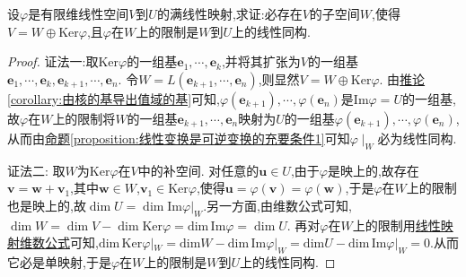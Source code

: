 \documentclass[../../main.tex]{subfiles}%
\begin{document}
\begin{example}
设\(\varphi\)是有限维线性空间\(V\)到\(U\)的满线性映射,求证:必存在\(V\)的子空间\(W\),使得\(V = W\oplus\text{Ker}\varphi\),且\(\varphi\)在\(W\)上的限制是\(W\)到\(U\)上的线性同构.
\end{example}
\begin{proof}

{\color{blue}证法一:}取\(\text{Ker}\varphi\)的一组基\(\boldsymbol{e}_1,\cdots,\boldsymbol{e}_k\),并将其扩张为\(V\)的一组基\(\boldsymbol{e}_1,\cdots,\boldsymbol{e}_k,\boldsymbol{e}_{k + 1},\cdots,\boldsymbol{e}_n\). 令\(W = L(\boldsymbol{e}_{k + 1},\cdots,\boldsymbol{e}_n)\),则显然\(V = W\oplus\text{Ker}\varphi\). 由\hyperref[corollary:由核的基导出值域的基]{推论\ref{corollary:由核的基导出值域的基}}可知,\(\varphi(\boldsymbol{e}_{k + 1}),\cdots,\varphi(\boldsymbol{e}_n)\)是\(\text{Im}\varphi = U\)的一组基,故\(\varphi\)在\(W\)上的限制将\(W\)的一组基\(\boldsymbol{e}_{k + 1},\cdots,\boldsymbol{e}_n\)映射为\(U\)的一组基\(\varphi(\boldsymbol{e}_{k + 1}),\cdots,\varphi(\boldsymbol{e}_n)\),从而由\hyperref[proposition:线性变换是可逆变换的充要条件1]{命题\ref{proposition:线性变换是可逆变换的充要条件1}}可知$\varphi \mid_{W}$必为线性同构.

{\color{blue}证法二:} 取\(W\)为\(\text{Ker}\varphi\)在\(V\)中的补空间. 对任意的\(\boldsymbol{u}\in U\),由于\(\varphi\)是映上的,故存在\(\boldsymbol{v}=\boldsymbol{w}+\boldsymbol{v}_1\),其中\(\boldsymbol{w}\in W\),\(\boldsymbol{v}_1\in\text{Ker}\varphi\),使得\(\boldsymbol{u}=\varphi(\boldsymbol{v})=\varphi(\boldsymbol{w})\),于是\(\varphi\)在\(W\)上的限制也是映上的,故$\dim U=\dim \text{Im}\varphi|_W$.另一方面,由维数公式可知,\(\dim W=\dim V-\dim\text{Ker}\varphi=\mathrm{dim}\,\mathrm{Im}\varphi =\dim U\). 再对\(\varphi\)在\(W\)上的限制用\hyperref[theorem:线性映射的维数公式]{线性映射维数公式}可知,$\mathrm{dim}\,\mathrm{Ker}\varphi |_W=\mathrm{dim}W-\mathrm{dim}\,\mathrm{Im}\varphi |_W=\mathrm{dim}U-\mathrm{dim}\,\mathrm{Im}\varphi |_W=0$.从而它必是单映射,于是\(\varphi\)在\(W\)上的限制是\(W\)到\(U\)上的线性同构. 
\end{proof}
\end{document}
